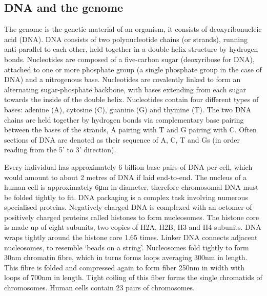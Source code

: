 \subsection{DNA and the genome}\label{subsec:dna}
The genome is the genetic material of an organism, it consists of deoxyribonucleic acid (DNA).
DNA consists of two polynucleotide chains (or strands), running anti-parallel to each other, held together in a double helix structure by hydrogen bonds.
Nucleotides are composed of a five-carbon sugar (deoxyribose for DNA), attached to one or more phosphate group (a single phosphate group in the case of DNA) and a nitrogenous base.
Nucleotides are covalently linked to form an alternating sugar-phosphate backbone, with bases extending from each sugar towards the inside of the double helix.
Nucleotides contain four different types of bases: adenine (A), cytosine (C), guanine (G) and thymine (T).
The two DNA chains are held together by hydrogen bonds via complementary base pairing between the bases of the strands, A pairing with T and G pairing with C\@.
Often sections of DNA are denoted as their sequence of A, C, T and Gs (in order reading from the 5' to 3' direction).

Every individual has approximately 6 billion base pairs of DNA per cell, which would amount to about 2 metres of DNA if laid end-to-end.
The nucleus of a human cell is approximately 6\si{\micro\meter} in diameter, therefore chromosomal DNA must be folded tightly to fit.
DNA packaging is a complex task involving numerous specialised proteins.
Negatively charged DNA is complexed with an octomer of positively charged proteins called histones to form nucleosomes.
The histone core is made up of eight subunits, two copies of H2A, H2B, H3 and H4 subunits.
DNA wraps tightly around the histone core 1.65 times.
Linker DNA connects adjacent nucleosomes, to resemble `beads on a string'.
Nucleosomes fold tightly to form 30\si{\nm} chromatin fibre, which in turns forms loops averaging 300\si{\nm} in length.
This fibre is folded and compressed again to form fiber 250\si{\nm} in width with loops of 700\si{\nm} in length.
Tight coiling of this fiber forms the single chromatids of chromosomes\cite{annunziato2008dna, alberts2002chromosomal}.
Human cells contain 23 pairs of chromosomes.

